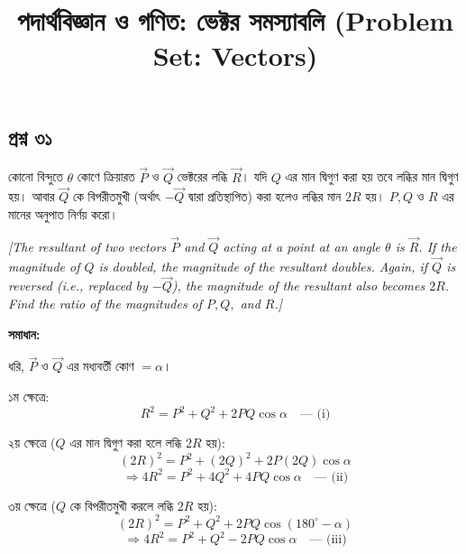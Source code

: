 \documentclass[11pt,a4paper]{article}
\title{\textbf{পদার্থবিজ্ঞান ও গণিত: ভেক্টর সমস্যাবলি (Problem Set: Vectors)}}
\author{}
\date{}
\begin{document}
\maketitle

\subsection*{প্রশ্ন ৩১}

কোনো বিন্দুতে $\theta$ কোণে ক্রিয়ারত $\vec{P}$ ও $\vec{Q}$ ভেক্টরের লব্ধি $\vec{R}$। যদি $Q$ এর মান দ্বিগুণ করা হয় তবে লব্ধির মান দ্বিগুণ হয়। আবার $\vec{Q}$ কে বিপরীতমুখী (অর্থাৎ $-\vec{Q}$ দ্বারা প্রতিস্থাপিত) করা হলেও লব্ধির মান $2R$ হয়। $P, Q$ ও $R$ এর মানের অনুপাত নির্ণয় করো।

\smallskip
\textit{[The resultant of two vectors $\vec{P}$ and $\vec{Q}$ acting at a point at an angle $\theta$ is $\vec{R}$. If the magnitude of $Q$ is doubled, the magnitude of the resultant doubles. Again, if $\vec{Q}$ is reversed (i.e., replaced by $-\vec{Q}$), the magnitude of the resultant also becomes $2R$. Find the ratio of the magnitudes of $P, Q,$ and $R$.]}

\vspace{0.3cm}
\begin{center}
\end{center}

\textbf{সমাধান:}

ধরি, $\vec{P}$ ও $\vec{Q}$ এর মধ্যবর্তী কোণ $= \alpha$।

১ম ক্ষেত্রে:
$$R^2 = P^2 + Q^2 + 2PQ\cos\alpha \quad \text{--- (i)}$$

২য় ক্ষেত্রে ($Q$ এর মান দ্বিগুণ করা হলে লব্ধি $2R$ হয়):
$$(2R)^2 = P^2 + (2Q)^2 + 2P(2Q)\cos\alpha$$
$$\Rightarrow 4R^2 = P^2 + 4Q^2 + 4PQ\cos\alpha \quad \text{--- (ii)}$$

৩য় ক্ষেত্রে ($Q$ কে বিপরীতমুখী করলে লব্ধি $2R$ হয়):
$$(2R)^2 = P^2 + Q^2 + 2PQ\cos(180^\circ - \alpha)$$
$$\Rightarrow 4R^2 = P^2 + Q^2 - 2PQ\cos\alpha \quad \text{--- (iii)}$$
\end{document}
